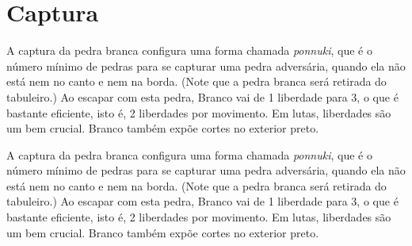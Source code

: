 \chapter{Captura}

\problemDiagrams
\answerDiagrams%
  {A captura da pedra branca configura uma forma chamada \emph{ponnuki}, que é o número mínimo de pedras para se capturar uma pedra adversária, quando ela não está nem no canto e nem na borda. (Note que a pedra branca será retirada do tabuleiro.)}%
  {Ao escapar com esta pedra, Branco vai de 1 liberdade para 3, o que é bastante eficiente, isto é, 2 liberdades por movimento. Em lutas, liberdades são um bem crucial. Branco também expõe cortes no exterior preto.}%

\problemDiagrams
\answerDiagrams%
  {A captura da pedra branca configura uma forma chamada \emph{ponnuki}, que é o número mínimo de pedras para se capturar uma pedra adversária, quando ela não está nem no canto e nem na borda. (Note que a pedra branca será retirada do tabuleiro.)}%
  {Ao escapar com esta pedra, Branco vai de 1 liberdade para 3, o que é bastante eficiente, isto é, 2 liberdades por movimento. Em lutas, liberdades são um bem crucial. Branco também expõe cortes no exterior preto.}%